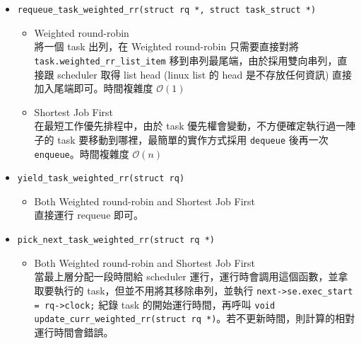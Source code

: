 \documentclass{res}
\begin{document}
\begin{resume}
\begin{itemize}
	\item
	\lstinline{requeue_task_weighted_rr(struct rq *, struct task_struct *)} \\
	\begin{itemize}
		\item Weighted round-robin \\
		將一個 task 出列，在 Weighted round-robin 只需要直接對將 \lstinline{task.weighted_rr_list_item} 移到串列最尾端，由於採用雙向串列，直接跟 scheduler 取得 list head (linux list 的 head 是不存放任何資訊) 直接加入尾端即可。時間複雜度 $\mathcal{O}(1)$
		\item Shortest Job First \\
		在最短工作優先排程中，由於 task 優先權會變動，不方便確定執行過一陣子的 task 要移動到哪裡，最簡單的實作方式採用 \lstinline{dequeue} 後再一次 \lstinline{enqueue}。時間複雜度 $\mathcal{O}(n)$
	\end{itemize}
	
	\item
	\lstinline{yield_task_weighted_rr(struct rq)} \\
	\begin{itemize}
		\item Both Weighted round-robin and Shortest Job First\\
		直接運行 requeue 即可。
	\end{itemize}
	
	\item
	\lstinline{pick_next_task_weighted_rr(struct rq *)}\\
	\begin{itemize}
		\item Both Weighted round-robin and Shortest Job First\\
		當最上層分配一段時間給 scheduler 運行，運行時會調用這個函數，並拿取要執行的 task，但並不用將其移除串列，並執行  \lstinline{next->se.exec_start = rq->clock;} 紀錄 task 的開始運行時間，再呼叫 \lstinline {void update_curr_weighted_rr(struct rq *)}。若不更新時間，則計算的相對運行時間會錯誤。
	\end{itemize}
	

\end{itemize}
\end{resume}
\end{document}
